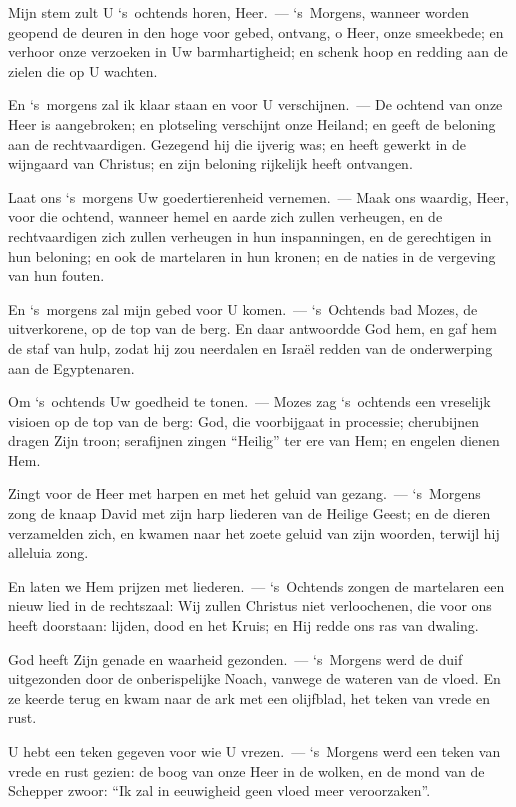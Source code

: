 \documentclass[12pt,twoside,a5paper]{article}
\begin{document}

\begin{halfparskip}
   Mijn stem zult U `s~ochtends horen, Heer.~--- `s~Morgens, wanneer worden geopend de deuren in den hoge voor gebed, ontvang, o Heer, onze smeekbede; en verhoor onze verzoeken in Uw barmhartigheid; en schenk hoop en redding aan de zielen die op U wachten.

  En `s~morgens zal ik klaar staan en voor U verschijnen.~--- De ochtend van onze Heer is aangebroken; en plotseling verschijnt onze Heiland; en geeft de beloning aan de rechtvaardigen. Gezegend hij die ijverig was; en heeft gewerkt in de wijngaard van Christus; en zijn beloning rijkelijk heeft ontvangen.

  Laat ons `s~morgens Uw goedertierenheid vernemen.~--- Maak ons waardig, Heer, voor die ochtend, wanneer hemel en aarde zich zullen verheugen, en de rechtvaardigen zich zullen verheugen in hun inspanningen, en de gerechtigen in hun beloning; en ook de martelaren in hun kronen; en de naties in de vergeving van hun fouten.

  En `s~morgens zal mijn gebed voor U komen.~--- `s~Ochtends bad Mozes, de uitverkorene, op de top van de berg. En daar antwoordde God hem, en gaf hem de staf van hulp, zodat hij zou neerdalen en Israël redden van de onderwerping aan de Egyptenaren.

  Om `s~ochtends Uw goedheid te tonen.~--- Mozes zag `s~ochtends een vreselijk visioen op de top van de berg: God, die voorbijgaat in processie; cherubijnen dragen Zijn troon; serafijnen zingen ``Heilig'' ter ere van Hem; en engelen dienen Hem.

  Zingt voor de Heer met harpen en met het geluid van gezang.~--- `s~Morgens zong de knaap David met zijn harp liederen van de Heilige Geest; en de dieren verzamelden zich, en kwamen naar het zoete geluid van zijn woorden, terwijl hij alleluia zong.

  En laten we Hem prijzen met liederen.~--- `s~Ochtends zongen de martelaren een nieuw lied in de rechtszaal: Wij zullen Christus niet verloochenen, die voor ons heeft doorstaan: lijden, dood en het Kruis; en Hij redde ons ras van dwaling.

  God heeft Zijn genade en waarheid gezonden.~--- `s~Morgens werd de duif uitgezonden door de onberispelijke Noach, vanwege de wateren van de vloed. En ze keerde terug en kwam naar de ark met een olijfblad, het teken van vrede en rust.

  U hebt een teken gegeven voor wie U vrezen.~--- `s~Morgens werd een teken van vrede en rust gezien: de boog van onze Heer in de wolken, en de mond van de Schepper zwoor: ``Ik zal in eeuwigheid geen vloed meer veroorzaken''.


\end{halfparskip}
\end{document}
